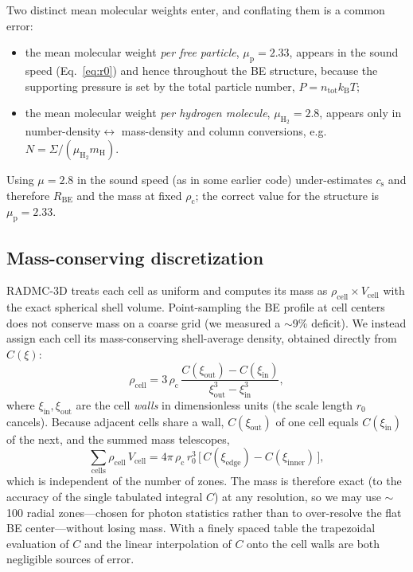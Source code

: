\documentclass[11pt,a4paper]{article}
\newcommand{\rhoc}{\rho_{\mathrm{c}}}
\newcommand{\cs}{c_{\mathrm{s}}}
\newcommand{\rzero}{r_{0}}
\newcommand{\Rbe}{R_{\mathrm{BE}}}
\newcommand{\mH}{m_{\mathrm{H}}}
\begin{document}
Two distinct mean molecular weights enter, and conflating them is a common
error:
\begin{itemize}
  \item the mean molecular weight \emph{per free particle},
        $\mu_{\mathrm p}=2.33$, appears in the sound speed
        (Eq.~\ref{eq:r0}) and hence throughout the BE structure, because
        the supporting pressure is set by the total particle number,
        $P=n_{\mathrm{tot}}k_{\mathrm B}T$;
  \item the mean molecular weight \emph{per hydrogen molecule},
        $\mu_{\mathrm{H_2}}=2.8$, appears only in number-density$\leftrightarrow$
        mass-density and column conversions, e.g.\
        $N = \Sigma/(\mu_{\mathrm{H_2}}\mH)$.
\end{itemize}
Using $\mu=2.8$ in the sound speed (as in some earlier code) under-estimates
$\cs$ and therefore $\Rbe$ and the mass at fixed $\rhoc$; the correct value
for the structure is $\mu_{\mathrm p}=2.33$.

\subsection{Mass-conserving discretization}
\label{sec:massconserv}

RADMC-3D treats each cell as uniform and computes its mass as
$\rho_{\mathrm{cell}}\times V_{\mathrm{cell}}$ with the exact spherical
shell volume. Point-sampling the BE profile at cell centers does not
conserve mass on a coarse grid (we measured a $\sim$9\% deficit). We instead
assign each cell its mass-conserving shell-average density, obtained
directly from $C(\xi)$:
\begin{equation}
  \rho_{\mathrm{cell}}
  = 3\,\rhoc\,
    \frac{C(\xi_{\mathrm{out}})-C(\xi_{\mathrm{in}})}
         {\xi_{\mathrm{out}}^{3}-\xi_{\mathrm{in}}^{3}},
  \label{eq:cellrho}
\end{equation}
where $\xi_{\mathrm{in}},\xi_{\mathrm{out}}$ are the cell \emph{walls} in
dimensionless units (the scale length $\rzero$ cancels). Because adjacent
cells share a wall, $C(\xi_{\mathrm{out}})$ of one cell equals
$C(\xi_{\mathrm{in}})$ of the next, and the summed mass telescopes,
\begin{equation}
  \sum_{\mathrm{cells}} \rho_{\mathrm{cell}}\,V_{\mathrm{cell}}
  = 4\pi\,\rhoc\,\rzero^{3}\,
    \big[\,C(\xi_{\mathrm{edge}})-C(\xi_{\mathrm{inner}})\,\big],
  \label{eq:telescope}
\end{equation}
which is independent of the number of zones. The mass is therefore exact
(to the accuracy of the single tabulated integral $C$) at any resolution,
so we may use $\sim$100 radial zones---chosen for photon statistics rather
than to over-resolve the flat BE center---without losing mass. With a
finely spaced table the trapezoidal evaluation of $C$ and the linear
interpolation of $C$ onto the cell walls are both negligible sources of
error.
\end{document}
